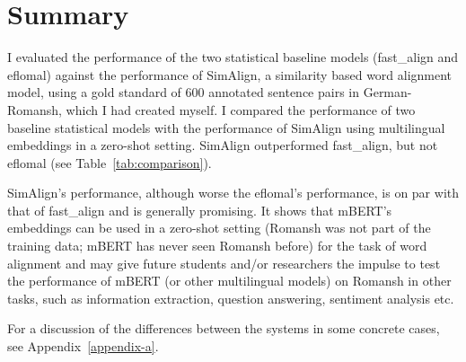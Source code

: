  
\section{Summary}
I evaluated the performance of the two statistical baseline models (fast\_align and eflomal)  against the performance of SimAlign, a similarity based word alignment model, using a gold standard of 600 annotated sentence pairs in German-Romansh, which I had created myself.
I compared the performance of two baseline statistical models with the performance of SimAlign using multilingual embeddings in a zero-shot setting. 
SimAlign outperformed fast\_align, but not eflomal (see Table~\ref{tab:comparison}). 

SimAlign's performance, although worse the eflomal's performance, is on par with that of fast\_align and is generally promising. 
It shows that mBERT's embeddings can be used in a zero-shot setting (Romansh was not part of the training data; mBERT has never seen Romansh before) for the task of word alignment and may give future students and/or researchers the impulse to test the performance of mBERT (or other multilingual models) on Romansh in other tasks, such as information extraction, question answering, sentiment analysis etc.

For a discussion of the differences between the systems in some concrete cases, see Appendix~\ref{appendix-a}.



